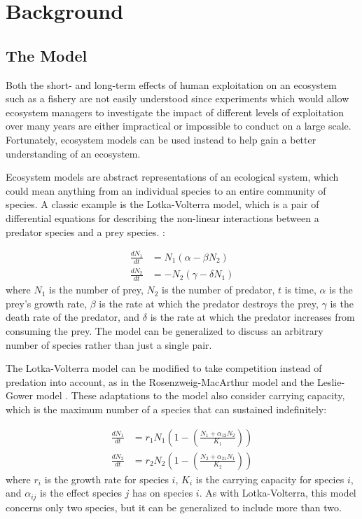 %
\chapter{Background}

\section{The Model}

Both the short- and long-term effects of human exploitation on an ecosystem such as a fishery are not easily understood since experiments which would allow ecosystem managers to investigate the impact of different levels of exploitation over many years are either impractical or impossible to conduct on a large scale.  Fortunately, ecosystem models can be used instead to help gain a better understanding of an ecosystem.

Ecosystem models are abstract representations of an ecological system, which could mean anything from an individual species to an entire community of species.  A classic example is the Lotka-Volterra model, which is a pair of differential equations for describing the non-linear interactions between a predator species and a prey species. \cite{lotka1926, volterra1926}:

\begin{align}
   \frac{d N_1}{dt} &=   N_1 \left(\alpha - \beta  N_2\right) 
\\ \frac{d N_2}{dt} &= - N_2 \left(\gamma - \delta N_1\right)
\end{align}
where $N_1$ is the number of prey, $N_2$ is the number of predator, $t$ is time, $\alpha$ is the prey's growth rate, $\beta$ is the rate at which the predator destroys the prey, $\gamma$ is the death rate of the predator, and $\delta$ is the rate at which the predator increases from consuming the prey.  The model can be generalized to discuss an arbitrary number of species rather than just a single pair.

The Lotka-Volterra model can be modified to take competition instead of predation into account, as in the Rosenzweig-MacArthur model \cite{rosenzweig1963} and the Leslie-Gower model \cite{leslie1960}.  These adaptations to the model also consider carrying capacity, which is the maximum number of a species that can sustained indefinitely:

\begin{align}
   \frac{d N_1}{dt} &= r_1 N_1 \left(1 - \left(\frac{N_1 + \alpha_{12} N_2}{K_1}\right)\right)
\\ \frac{d N_2}{dt} &= r_2 N_2 \left(1 - \left(\frac{N_2 + \alpha_{21} N_1}{K_2}\right)\right)
\end{align}
where $r_i$ is the growth rate for species $i$, $K_i$ is the carrying capacity for species $i$, and $\alpha_{ij}$ is the effect species $j$ has on species $i$.  As with Lotka-Volterra, this model concerns only two species, but it can be generalized to include more than two.

